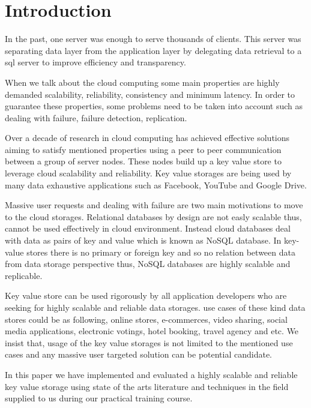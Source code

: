 \documentclass{sig-alternate}
\begin{document}
\section{Introduction}

In the past, one server was enough to serve thousands of clients. This server was separating data layer from the application layer by delegating data retrieval to a sql server to improve efficiency and transparency.

When we talk about the cloud computing some main properties are highly demanded scalability, reliability, consistency and minimum latency. In order to guarantee these properties, some problems need to be taken into account such as dealing with failure, failure detection, replication.

Over a decade of research in cloud computing has achieved effective solutions aiming to satisfy mentioned properties using a peer to peer communication between a group of server nodes. These nodes build up a key value store to leverage cloud scalability and reliability. Key value storages are being used by many data exhaustive applications such as Facebook, YouTube and Google Drive.  

Massive user requests and dealing with failure are two main motivations to move to the cloud storages. Relational databases by design are not easly scalable thus, cannot be used effectively in  cloud environment. Instead cloud databases deal with data as pairs of key and value which is known as NoSQL database. In key-value stores there is no primary or foreign key and so no relation between data from data storage perspective thus, NoSQL databases are highly scalable and replicable.


Key value store can be used rigorously by all application developers who are seeking for highly scalable and reliable data storages. use cases of  these kind data stores could be as following, online stores, e-commerces, video sharing, social media applications, electronic votings, hotel booking, travel agency and etc. We insist that, usage of the key value storages is not limited to the mentioned use cases and any massive user targeted solution can be potential candidate.

In this paper we have implemented and evaluated a highly scalable and reliable  key value storage using state of the arts literature and  techniques in the field supplied to us during our practical training course. 
\end{document}
